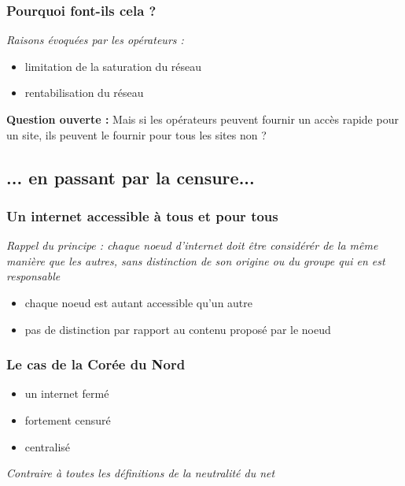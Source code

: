 \begin{frame}\frametitle{Pourquoi font-ils cela ?}
    \emph{Raisons évoquées par les opérateurs :}
    \begin{itemize}
        \item limitation de la saturation du réseau
        \item rentabilisation du réseau\\
    \end{itemize}

    \vspace{1em}

    \textbf{Question ouverte : } Mais si les opérateurs peuvent fournir un
    accès rapide pour un site, ils peuvent le fournir pour tous les sites non ?
\end{frame}


\subsection{... en passant par la censure...}
\begin{frame}\frametitle{Un internet accessible à tous et pour tous}
    \emph{Rappel du principe : chaque noeud d'internet doit être considérér de
        la même manière que les autres, sans distinction de son origine ou du
    groupe qui en est responsable}

    \vspace{1em}

    \begin{itemize}
        \item chaque noeud est autant accessible qu'un autre
        \item pas de distinction par rapport au contenu proposé par le noeud
    \end{itemize}
\end{frame}


\begin{frame}\frametitle{Le cas de la Corée du Nord}
    \begin{itemize}
        \item un internet fermé
        \item fortement censuré
        \item centralisé
    \end{itemize}

    \vspace{1em}

    \color{red}\emph{Contraire à toutes les définitions de la neutralité du net}
\end{frame}



